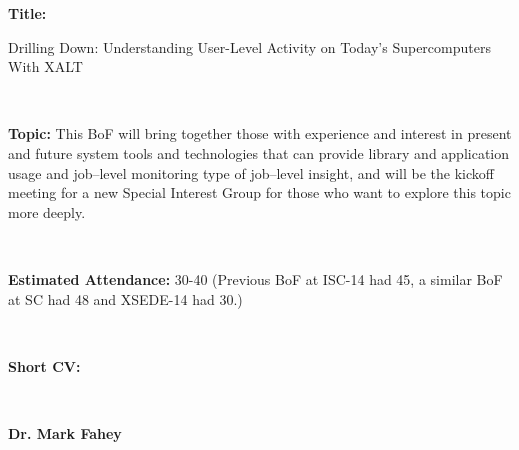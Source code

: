 \documentclass[12pt]{article}
\begin{document}
%
%
%
%
%
%
% 
% 
%
%
%
%
%
%

\noindent
{\bf{}Title:} 


Drilling Down: Understanding User-Level Activity on Today's Supercomputers With XALT

~~

\noindent
{\bf{}Topic:}
This BoF will bring together those with experience and interest in
present and future system tools and technologies that can provide
library and application usage and job--level monitoring type of
job--level insight, and will be the kickoff meeting for a new Special
Interest Group for those who want to explore this topic more deeply.

~~

\noindent
{\bf{}Estimated Attendance:} 
30-40  (Previous BoF at	ISC-14 had 45, a similar BoF at	SC had 48 and
XSEDE-14 had 30.)	


~~

\noindent
{\bf{}Short CV:} 

~~

\noindent
{\bf{}Dr. Mark Fahey}
\end{document}

